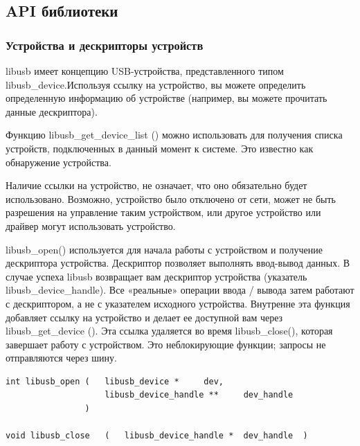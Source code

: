 \documentclass[14pt,a4paper]{article}
\begin{document}
\subsection{API библиотеки}

\subsubsection{Устройства и дескрипторы устройств}
\par libusb имеет концепцию USB-устройства, представленного типом libusb\_device.Используя ссылку на устройство, вы можете определить определенную информацию об устройстве (например, вы можете прочитать данные дескриптора). \\

\par Функцию libusb\_get\_device\_list () можно использовать для получения списка устройств, подключенных в данный момент к системе. Это известно как обнаружение устройства.\\

\par Наличие ссылки на устройство, не означает, что оно обязательно будет использовано. Возможно, устройство было отключено от сети, может не быть разрешения на управление таким устройством, или другое устройство или драйвер могут использовать устройство.\\

\par libusb\_open() используется для начала работы с устройством и получение дескриптора устройства. Дескриптор позволяет выполнять ввод-вывод данных. В случае успеха libusb возвращает вам дескриптор устройства (указатель libusb\_device\_handle). Все «реальные» операции ввода / вывода затем работают с дескриптором, а не с указателем исходного устройства. Внутренне эта функция добавляет ссылку на устройство и делает ее доступной вам через libusb\_get\_device (). Эта ссылка удаляется во время libusb\_close(), которая завершает работу с устройством. Это неблокирующие функции; запросы не отправляются через шину. 

\begin{lstlisting}[language=c caption={Подключение/отключение драйвера}]
int libusb_open	(	libusb_device * 	dev,
                    libusb_device_handle ** 	dev_handle 
                )	
                
void libusb_close	(	libusb_device_handle * 	dev_handle	)	
\end{lstlisting}
\end{document}
